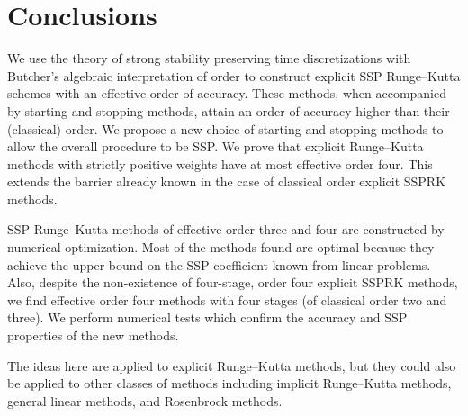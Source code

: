 \section{Conclusions}\label{sec:Conclusion}
We use the theory of strong stability preserving time discretizations
with Butcher's algebraic interpretation of order to construct
explicit SSP Runge--Kutta schemes with an effective order of accuracy.
These methods, when accompanied by starting and stopping
methods, attain an order of accuracy higher than their (classical) order.
We propose a new choice of starting and stopping methods to allow the
overall procedure to be SSP.
We prove that explicit Runge--Kutta methods with strictly positive 
weights have at most effective order four. 
This extends the barrier already known in the case of classical order
explicit SSPRK methods.

SSP Runge--Kutta methods of effective order three and four
are constructed by numerical optimization.
Most of the methods found are optimal because they achieve
the upper bound on the SSP coefficient known from linear
problems.
Also, despite the non-existence of four-stage, order four explicit SSPRK methods, 
we find effective order four methods with four stages (of classical 
order two and three). 
We perform numerical tests which confirm the accuracy and
SSP properties of the new methods.

The ideas here are applied to explicit Runge--Kutta methods, but they
could also be applied to other classes of methods including implicit
Runge--Kutta methods, general linear methods, and Rosenbrock methods.

